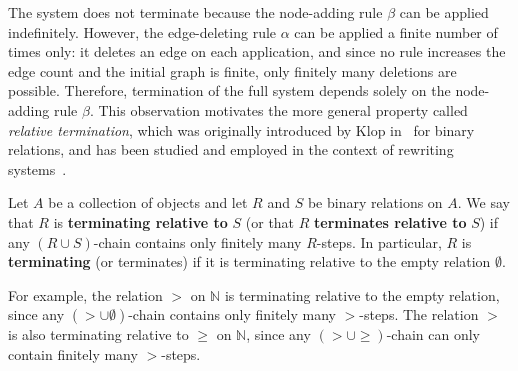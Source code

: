 \begin{center}
{{
            }
        }
            \end{center}
The system does not terminate because the node-adding rule $\beta$ can be applied indefinitely. However, the edge-deleting rule $\alpha$ can be applied a finite number of times only: it deletes an edge on each application, and since no rule increases the edge count and the initial graph is finite, only finitely many deletions are possible. Therefore, termination of the full system depends solely on the node-adding rule $\beta$. This observation motivates the more general property called \emph{relative termination}, which was originally introduced by Klop in~\cite{klop1987term} for binary relations, and has been studied and employed in the context of rewriting systems~\cite{geser1990relative,kassing2024dependency,endrullis2024generalized_icgt,zantema2014termination,bruggink2014termination,bruggink2015proving}. 

\begin{definition}
Let $A$ be a collection of objects and let $R$ and $S$ be binary relations on $A$. 
We say that $R$ is \textbf{terminating relative to} $S$ (or that $R$ \textbf{terminates relative to} $S$) if 
any $(R \cup S)$-chain contains only finitely many $R$-steps.
In particular, $R$ is \textbf{terminating} (or terminates) if it is terminating relative to the empty relation $\emptyset$.
\end{definition}

For example, the relation $>$ on $\mathbb{N}$ is terminating relative to the empty relation, since any $(> \cup \emptyset)$-chain contains only finitely many $>$-steps. The relation $>$ is also terminating relative to $\geq$ on $\mathbb{N}$, since any $(> \cup \geq)$-chain can only contain finitely many $>$-steps. 

